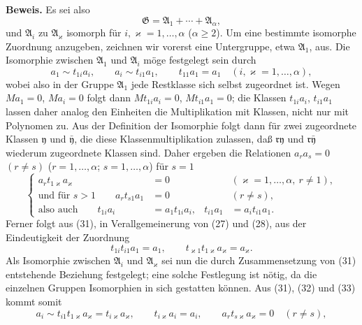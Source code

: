 \documentclass[11pt]{article}
\begin{document}
\textbf{Beweis.} Es sei also
\[
  \mathfrak G=\mathfrak A_1+\cdots+\mathfrak A_\alpha,
\]
und $\mathfrak A_i$ zu $\mathfrak A_\varkappa$ isomorph für $i,\varkappa=1,\ldots,\alpha$ ($\alpha\ge2$). Um eine bestimmte isomorphe Zuordnung anzugeben, zeichnen wir vorerst eine Untergruppe, etwa $\mathfrak A_1$, aus. Die Isomorphie zwischen $\mathfrak A_1$ und $\mathfrak A_i$ möge festgelegt sein durch
\begin{equation}
 a_1\sim t_{1i}a_i,\qquad a_i\sim t_{i1}a_1,\qquad t_{11}a_1=a_1
 \quad (i,\varkappa=1,\ldots,\alpha),
\tag{31}
\end{equation}
wobei also in der Gruppe $\mathfrak A_1$ jede Restklasse sich selbst zugeordnet ist. Wegen $Ma_1=0$, $Ma_i=0$ folgt dann $Mt_{1i}a_i=0$, $Mt_{i1}a_1=0$; die Klassen $t_{1i}a_i$, $t_{i1}a_1$ lassen daher analog den Einheiten die Multiplikation mit Klassen, nicht nur mit Polynomen zu. Aus der Definition der Isomorphie folgt dann für zwei zugeordnete Klassen $\mathfrak y$ und $\bar{\mathfrak y}$, die diese Klassenmultiplikation zulassen, daß $\mathfrak r\mathfrak y$ und $\mathfrak r\bar{\mathfrak y}$ wiederum zugeordnete Klassen sind. Daher ergeben die Relationen $a_ra_s=0$ $(r\ne s)$ ($r=1,\ldots,\alpha$; $s=1,
\ldots,\alpha$) für $s=1$
\begin{equation}
\left\{
\begin{aligned}
 a_r t_{1\varkappa}a_\varkappa&=0 &&(\varkappa=1,
\ldots,\alpha,
\ r\ne1),\\
 \text{und für }s>1\qquad a_r t_{s1}a_1&=0 &&(r\ne s),\\
 \text{also auch}\qquad t_{1i}a_i&=a_1t_{1i}a_i,
 & t_{i1}a_1&=a_it_{i1}a_1.
\end{aligned}\right.
\tag{32}
\end{equation}
Ferner folgt aus (31), in Verallgemeinerung von (27) und (28), aus der Eindeutigkeit der Zuordnung
\begin{equation}
 t_{1i}t_{i1}a_1=a_1,
 \qquad
 t_{\varkappa1}t_{1\varkappa}a_\varkappa=a_\varkappa.
\tag{33}
\end{equation}
Als Isomorphie zwischen $\mathfrak A_i$ und $\mathfrak A_\varkappa$ sei nun die durch Zusammensetzung von (31) entstehende Beziehung festgelegt; eine solche Festlegung ist nötig, da die einzelnen Gruppen Isomorphien in sich gestatten können. Aus (31), (32) und (33) kommt somit
\begin{equation}
 a_i\sim t_{i1}t_{1\varkappa}a_\varkappa=t_{i\varkappa}a_\varkappa,
 \qquad
 t_{i\varkappa}a_i=a_i,
 \qquad
 a_rt_{s\varkappa}a_\varkappa=0\quad (r\ne s),
\tag{34}
\end{equation}
\end{document}
